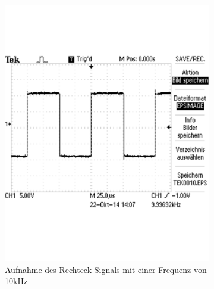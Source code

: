 \documentclass[12pt,a4paper]{article}
\begin{document}
\begin{figure}[H]
\begin{subfigure}[b]{0.28\textwidth}
                \includegraphics[width=\textwidth , scale = 0.4]{2_2_rech_10khz.pdf}
                \caption[Aufnahme des Rechtecksignals mit einer Frequenz von 10kHz]{Aufnahme des Rechteck Signals mit einer Frequenz von 10kHz}
                \label{fig:2_2_rech_10khz}
        \end{subfigure}
        ~ %
        \hfill
        \begin{subfigure}[b]{0.28\textwidth}

\end{subfigure}
\end{figure}
\end{document}
